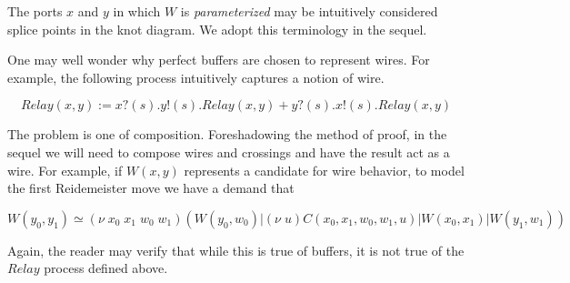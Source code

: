 The ports $x$ and $y$ in which $W$ is \emph{parameterized} may be
intuitively considered splice points in the knot diagram. We adopt
this terminology in the sequel.

One may well wonder why perfect buffers are chosen to represent
wires. For example, the following process intuitively captures a notion of wire.

\begin{equation*}
  Relay(x,y) := x?(s).y!(s).Relay(x,y) + y?(s).x!(s).Relay(x,y)
\end{equation*}

The problem is one of composition. Foreshadowing the method of proof,
in the sequel we will need to compose wires and crossings and have the
result act as a wire. For example, if $W(x,y)$ represents a candidate
for wire behavior, to model the first Reidemeister move we have a demand that

\begin{equation*}
  W(y_{0},y_{1}) \simeq (\nu \; x_{0} \; x_{1} \; w_{0} \; w_{1} )(W(y_{0},w_{0}) |(\nu \; u)C(x_{0},x_{1},w_{0},w_{1},u) | W(x_{0},x_{1}) | W(y_{1},w_{1}))
\end{equation*}

Again, the reader may verify that while this is true of buffers, it is
not true of the $Relay$ process defined above.
